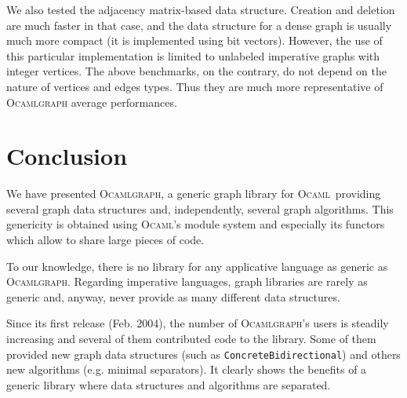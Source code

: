 \documentclass[]{tfp05symp}
\newcommand{\ocamlgraph}{\textsc{Ocamlgraph}\xspace}
\newcommand{\ocaml}{\textsc{Ocaml}\xspace}
\begin{document}
% 

We also tested the adjacency matrix-based data structure. Creation and
deletion are much faster in that case, and the data structure for
a dense graph is usually much more compact (it is implemented using bit
vectors). However, the use of this particular implementation is
limited to unlabeled imperative graphs with integer vertices. 
The above benchmarks, on the contrary, do not depend on the nature of
vertices and edges types. Thus they are much more representative of
\ocamlgraph average performances.


\section{Conclusion}

We have presented \ocamlgraph, a generic graph library for \ocaml\
providing several graph data structures and, independently, several
graph algorithms. This genericity is obtained using \ocaml's module
system and especially its functors which allow to share large pieces
of code.

To our knowledge, there is no library for any applicative language as
generic as \ocamlgraph. Regarding imperative languages, graph
libraries are rarely as generic and, anyway, never provide as many
different data structures.

Since its first release (Feb. 2004), the number of \ocamlgraph's users
is steadily increasing and several of them contributed code to the
library. Some of them provided new graph data structures (such as
\texttt{ConcreteBidirectional}) and others new algorithms
(e.g. minimal separators). It clearly shows the benefits of a generic
library where data structures and algorithms are separated.





\nocite{*}




\end{document}
